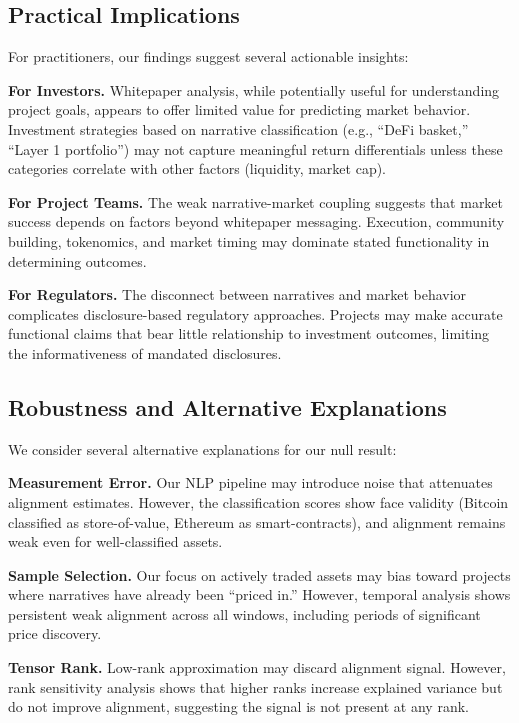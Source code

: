 \documentclass[11pt,twocolumn]{article}
\begin{document}
\subsection{Practical Implications}

For practitioners, our findings suggest several actionable insights:

\textbf{For Investors.} Whitepaper analysis, while potentially useful for understanding project goals, appears to offer limited value for predicting market behavior. Investment strategies based on narrative classification (e.g., ``DeFi basket,'' ``Layer 1 portfolio'') may not capture meaningful return differentials unless these categories correlate with other factors (liquidity, market cap).

\textbf{For Project Teams.} The weak narrative-market coupling suggests that market success depends on factors beyond whitepaper messaging. Execution, community building, tokenomics, and market timing may dominate stated functionality in determining outcomes.

\textbf{For Regulators.} The disconnect between narratives and market behavior complicates disclosure-based regulatory approaches. Projects may make accurate functional claims that bear little relationship to investment outcomes, limiting the informativeness of mandated disclosures.

\subsection{Robustness and Alternative Explanations}

We consider several alternative explanations for our null result:

\textbf{Measurement Error.} Our NLP pipeline may introduce noise that attenuates alignment estimates. However, the classification scores show face validity (Bitcoin classified as store-of-value, Ethereum as smart-contracts), and alignment remains weak even for well-classified assets.

\textbf{Sample Selection.} Our focus on actively traded assets may bias toward projects where narratives have already been ``priced in.'' However, temporal analysis shows persistent weak alignment across all windows, including periods of significant price discovery.

\textbf{Tensor Rank.} Low-rank approximation may discard alignment signal. However, rank sensitivity analysis shows that higher ranks increase explained variance but do not improve alignment, suggesting the signal is not present at any rank.
\end{document}
